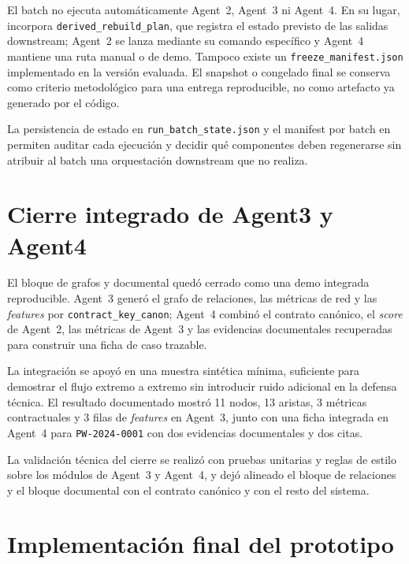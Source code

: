 \documentclass[11pt,a4paper,spanish]{book}
\numberwithin{equation}{chapter}
\numberwithin{figure}{chapter}
\begin{document}
El batch no ejecuta autom{\'a}ticamente Agent~2, Agent~3 ni Agent~4. En su lugar, incorpora
\texttt{derived\_rebuild\_plan}, que registra el estado previsto de las salidas downstream; Agent~2 se
lanza mediante su comando espec{\'i}fico y Agent~4 mantiene una ruta manual o de demo. Tampoco existe
un \texttt{freeze\_manifest.json} implementado en la versi{\'o}n evaluada. El snapshot o congelado
final se conserva como criterio metodol{\'o}gico para una entrega reproducible, no como artefacto ya
generado por el c{\'o}digo.

La persistencia de estado en \texttt{run\_batch\_state.json} y el manifest por batch en
 permiten auditar cada ejecuci{\'o}n
y decidir qu{\'e} componentes deben regenerarse sin atribuir al batch una orquestaci{\'o}n downstream
que no realiza.

\section{Cierre integrado de Agent3 y Agent4}
\label{sec:cierre_agent3_agent4_cap6}

El bloque de grafos y documental qued{\'o} cerrado como una demo integrada reproducible. Agent~3
gener{\'o} el grafo de relaciones, las m{\'e}tricas de red y las \textit{features} por
\texttt{contract\_key\_canon}; Agent~4 combin{\'o} el contrato can{\'o}nico, el \textit{score} de
Agent~2, las m{\'e}tricas de Agent~3 y las evidencias documentales recuperadas para construir una
ficha de caso trazable.

La integraci{\'o}n se apoy{\'o} en una muestra sint{\'e}tica m{\'i}nima, suficiente para demostrar el
flujo extremo a extremo sin introducir ruido adicional en la defensa t{\'e}cnica. El resultado
documentado mostr{\'o} 11 nodos, 13 aristas, 3 m{\'e}tricas contractuales y 3 filas de \textit{features}
en Agent~3, junto con una ficha integrada en Agent~4 para \texttt{PW-2024-0001} con dos evidencias
documentales y dos citas.

La validaci{\'o}n t{\'e}cnica del cierre se realiz{\'o} con pruebas unitarias y reglas de estilo sobre
los m{\'o}dulos de Agent~3 y Agent~4, y dej{\'o} alineado el bloque de relaciones y el bloque
documental con el contrato can{\'o}nico y con el resto del sistema.

\section{Implementaci{\'o}n final del prototipo}
\label{sec:implementacion_real_integracion}
\end{document}
